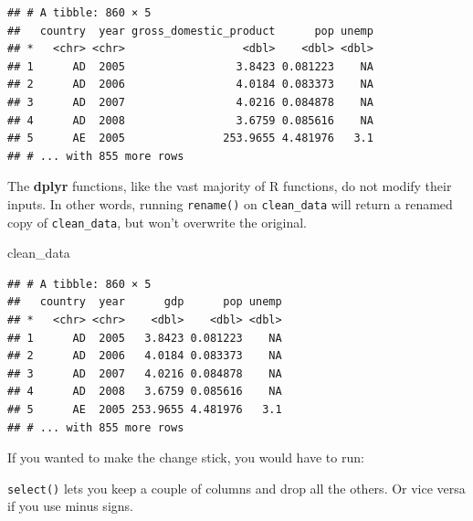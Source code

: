 \documentclass[12pt,oneside,openany]{book}
\newenvironment{Shaded}{\begin{snugshade}}{\end{snugshade}}
\newcommand{\KeywordTok}[1]{\textcolor[rgb]{0.13,0.29,0.53}{\textbf{{#1}}}}
\newcommand{\DataTypeTok}[1]{\textcolor[rgb]{0.13,0.29,0.53}{{#1}}}
\newcommand{\StringTok}[1]{\textcolor[rgb]{0.31,0.60,0.02}{{#1}}}
\newcommand{\NormalTok}[1]{{#1}}
\begin{document}
\begin{verbatim}
## # A tibble: 860 × 5
##   country  year gross_domestic_product      pop unemp
## *   <chr> <chr>                  <dbl>    <dbl> <dbl>
## 1      AD  2005                 3.8423 0.081223    NA
## 2      AD  2006                 4.0184 0.083373    NA
## 3      AD  2007                 4.0216 0.084878    NA
## 4      AD  2008                 3.6759 0.085616    NA
## 5      AE  2005               253.9655 4.481976   3.1
## # ... with 855 more rows
\end{verbatim}

The \textbf{dplyr} functions, like the vast majority of R functions, do
not modify their inputs. In other words, running \texttt{rename()} on
\texttt{clean\_data} will return a renamed copy of \texttt{clean\_data},
but won't overwrite the original.

\begin{Shaded}
\begin{Highlighting}[]
\NormalTok{clean_data}
\end{Highlighting}
\end{Shaded}

\begin{verbatim}
## # A tibble: 860 × 5
##   country  year      gdp      pop unemp
## *   <chr> <chr>    <dbl>    <dbl> <dbl>
## 1      AD  2005   3.8423 0.081223    NA
## 2      AD  2006   4.0184 0.083373    NA
## 3      AD  2007   4.0216 0.084878    NA
## 4      AD  2008   3.6759 0.085616    NA
## 5      AE  2005 253.9655 4.481976   3.1
## # ... with 855 more rows
\end{verbatim}

If you wanted to make the change stick, you would have to run:

\begin{Shaded}
\end{Shaded}

\texttt{select()} lets you keep a couple of columns and drop all the
others. Or vice versa if you use minus signs.

\begin{Shaded}
\end{Shaded}
\end{document}
